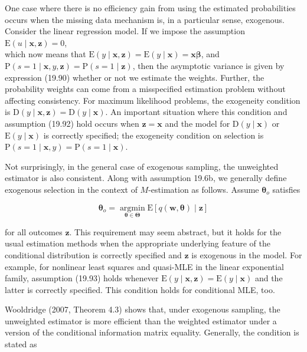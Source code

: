 \documentclass[10pt]{article}
\begin{document}
One case where there is no efficiency gain from using the estimated probabilities occurs when the missing data mechanism is, in a particular sense, exogenous. Consider the linear regression model. If we impose the assumption\\
$\mathrm{E}(u \mid \mathbf{x}, \mathbf{z})=0$,\\
which now means that $\mathrm{E}(y \mid \mathbf{x}, \mathbf{z})=\mathrm{E}(y \mid \mathbf{x})=\mathbf{x} \boldsymbol{\beta}$, and $\mathrm{P}(s=1 \mid \mathbf{x}, y, \mathbf{z})=\mathrm{P}(s=1 \mid \mathbf{z})$, then the asymptotic variance is given by expression (19.90) whether or not we estimate the weights. Further, the probability weights can come from a misspecified estimation problem without affecting consistency. For maximum likelihood problems, the exogeneity condition is $\mathrm{D}(y \mid \mathbf{x}, \mathbf{z})=\mathrm{D}(y \mid \mathbf{x})$. An important situation where this condition and assumption (19.92) hold occurs when $\mathbf{z}=\mathbf{x}$ and the model for $\mathrm{D}(y \mid \mathbf{x})$ or $\mathrm{E}(y \mid \mathbf{x})$ is correctly specified; the exogeneity condition on selection is $\mathrm{P}(s=1 \mid \mathbf{x}, y)=\mathrm{P}(s=1 \mid \mathbf{x})$.

Not surprisingly, in the general case of exogenous sampling, the unweighted estimator is also consistent. Along with assumption 19.6b, we generally define exogenous selection in the context of $M$-estimation as follows. Assume $\boldsymbol{\theta}_{o}$ satisfies


\begin{equation*}
\boldsymbol{\theta}_{o}=\underset{\boldsymbol{\theta} \in \boldsymbol{\Theta}}{\operatorname{argmin}} \mathrm{E}[q(\mathbf{w}, \boldsymbol{\theta}) \mid \mathbf{z}] \tag{19.93}
\end{equation*}


for all outcomes $\mathbf{z}$. This requirement may seem abstract, but it holds for the usual estimation methods when the appropriate underlying feature of the conditional distribution is correctly specified and $\mathbf{z}$ is exogenous in the model. For example, for nonlinear least squares and quasi-MLE in the linear exponential family, assumption (19.93) holds whenever $\mathrm{E}(y \mid \mathbf{x}, \mathbf{z})=\mathrm{E}(y \mid \mathbf{x})$ and the latter is correctly specified. This condition holds for conditional MLE, too.

Wooldridge (2007, Theorem 4.3) shows that, under exogenous sampling, the unweighted estimator is more efficient than the weighted estimator under a version of the conditional information matrix equality. Generally, the condition is stated as
\end{document}
